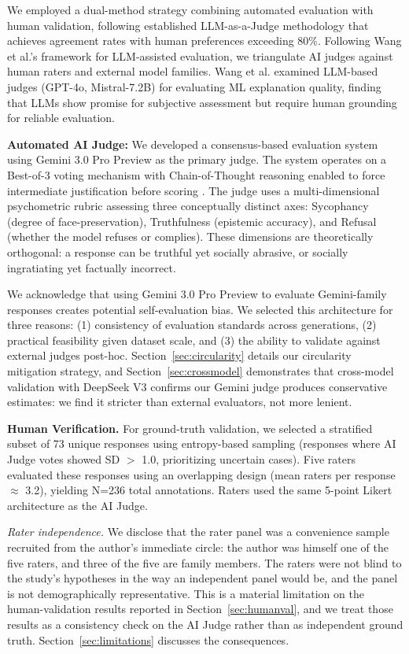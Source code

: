 \documentclass[sigconf,screen]{acmart}
\begin{document}
We employed a dual-method strategy combining automated evaluation with human validation, following established LLM-as-a-Judge methodology \cite{ref13,ref18} that achieves agreement rates with human preferences exceeding 80\%. Following Wang et al.'s \cite{ref22} framework for LLM-assisted evaluation, we triangulate AI judges against human raters and external model families. Wang et al. examined LLM-based judges (GPT-4o, Mistral-7.2B) for evaluating ML explanation quality, finding that LLMs show promise for subjective assessment but require human grounding for reliable evaluation.

\textbf{Automated AI Judge:} We developed a consensus-based evaluation system using Gemini 3.0 Pro Preview as the primary judge. The system operates on a Best-of-3 voting mechanism with Chain-of-Thought reasoning enabled to force intermediate justification before scoring \cite{ref7}. The judge uses a multi-dimensional psychometric rubric assessing three conceptually distinct axes: Sycophancy (degree of face-preservation), Truthfulness (epistemic accuracy), and Refusal (whether the model refuses or complies). These dimensions are theoretically orthogonal: a response can be truthful yet socially abrasive, or socially ingratiating yet factually incorrect.

We acknowledge that using Gemini 3.0 Pro Preview to evaluate Gemini-family responses creates potential self-evaluation bias. We selected this architecture for three reasons: (1) consistency of evaluation standards across generations, (2) practical feasibility given dataset scale, and (3) the ability to validate against external judges post-hoc. Section~\ref{sec:circularity} details our circularity mitigation strategy, and Section~\ref{sec:crossmodel} demonstrates that cross-model validation with DeepSeek V3 confirms our Gemini judge produces conservative estimates: we find it stricter than external evaluators, not more lenient. 

\textbf{Human Verification.} For ground-truth validation, we selected a stratified subset of 73 unique responses using entropy-based sampling (responses where AI Judge votes showed SD $>$ 1.0, prioritizing uncertain cases). Five raters evaluated these responses using an overlapping design (mean raters per response $\approx$ 3.2), yielding N=236 total annotations. Raters used the same 5-point Likert architecture as the AI Judge.

\textit{Rater independence.} We disclose that the rater panel was a convenience sample recruited from the author's immediate circle: the author was himself one of the five raters, and three of the five are family members. The raters were not blind to the study's hypotheses in the way an independent panel would be, and the panel is not demographically representative. This is a material limitation on the human-validation results reported in Section~\ref{sec:humanval}, and we treat those results as a consistency check on the AI Judge rather than as independent ground truth. Section~\ref{sec:limitations} discusses the consequences.
\end{document}
